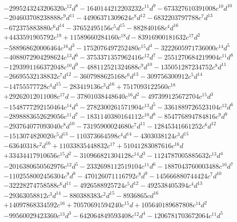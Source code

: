 {\begin{align*}
&-2995243243206320c^{12}d^{8}-1640144212203232c^{11}d^{9}-673327610391008c^{10}d^{10}\\
&-204603708238888c^{9}d^{11}-44906371309624c^{8}d^{12}-6832203797788c^{7}d^{13}\\
&-672375883880c^{6}d^{14}-37652495156c^{5}d^{15}-882840168c^{4}d^{16}\\
&+4433591905792c^{19}+11589660284160c^{18}d-83916900181632c^{17}d^{2}\\
&-588968620006464c^{16}d^{3}-1752076497252480c^{15}d^{4}-3222605971736000c^{14}d^{5}\\
&-4088072904298624c^{13}d^{6}-3753371357962416c^{12}d^{7}-2551270684219904c^{11}d^{8}\\
&-1293991166372048c^{10}d^{9}-488112521324688c^{9}d^{10}-135051287234752c^{8}d^{11}\\
&-26695532138832c^{7}d^{12}-3607988625168c^{6}d^{13}-309756300912c^{5}d^{14}\\
&-14755577728c^{4}d^{15}-283419136c^{3}d^{16}+7517093122560c^{18}\\
&+29262012011008c^{17}d-37801038448640c^{16}d^{2}-497399125672704c^{15}d^{3}\\
&-1548777292150464c^{14}d^{4}-2782300261571904c^{13}d^{5}-3361889726523104c^{12}d^{6}\\
&-2898883652629056c^{11}d^{7}-1831140380164112c^{10}d^{8}-854776894784816c^{9}d^{9}\\
&-293764077093040c^{8}d^{10}-73195900024680c^{7}d^{11}-12845341661252c^{6}d^{12}\\
&-1513074820020c^{5}d^{13}-110373664598c^{4}d^{14}-4303038124c^{3}d^{15}\\
&-63640318c^{2}d^{16}+11033835448832c^{17}+51041283087616c^{16}d\\
&+33434417910656c^{15}d^{2}-310966821304128c^{14}d^{3}-1124787005885632c^{13}d^{4}\\
&-2016380650562976c^{12}d^{5}-2332698112519104c^{11}d^{6}-1887043760003488c^{10}d^{7}\\
&-1102558002456304c^{9}d^{8}-470126071116792c^{8}d^{9}-145666880744424c^{7}d^{10}\\
&-32228274758588c^{6}d^{11}-4926588925724c^{5}d^{12}-492538405394c^{4}d^{13}\\
&-29363058812c^{3}d^{14}-880388383c^{2}d^{15}-8936865cd^{16}\\
&+14097868334592c^{16}+70570691594240c^{15}d+105640189687808c^{14}d^{2}\\
&-99560029423360c^{13}d^{3}-642064849593408c^{12}d^{4}-1206781703672064c^{11}d^{5}\\

\end{align*}}
